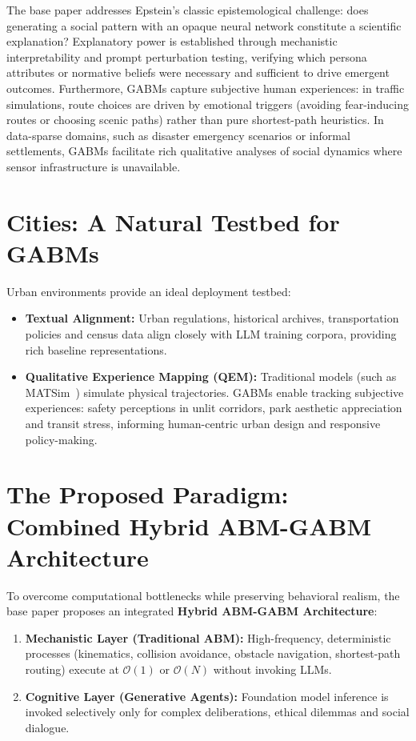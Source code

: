 \documentclass[12pt,a4paper]{report}
\begin{document}
The base paper addresses Epstein's classic epistemological challenge: does generating a social pattern with an opaque neural network constitute a scientific explanation? Explanatory power is established through mechanistic interpretability and prompt perturbation testing, verifying which persona attributes or normative beliefs were necessary and sufficient to drive emergent outcomes. Furthermore, GABMs capture subjective human experiences: in traffic simulations, route choices are driven by emotional triggers (avoiding fear-inducing routes or choosing scenic paths) rather than pure shortest-path heuristics. In data-sparse domains, such as disaster emergency scenarios or informal settlements, GABMs facilitate rich qualitative analyses of social dynamics where sensor infrastructure is unavailable.

\section{Cities: A Natural Testbed for GABMs}
\label{sec:cities_testbed}

Urban environments provide an ideal deployment testbed:
\begin{itemize}
    \item \textbf{Textual Alignment:} Urban regulations, historical archives, transportation policies and census data align closely with LLM training corpora, providing rich baseline representations.
    \item \textbf{Qualitative Experience Mapping (QEM):} Traditional models (such as MATSim~\cite{matsim2016}) simulate physical trajectories. GABMs enable tracking subjective experiences: safety perceptions in unlit corridors, park aesthetic appreciation and transit stress, informing human-centric urban design and responsive policy-making.
\end{itemize}

\section{The Proposed Paradigm: Combined Hybrid ABM-GABM Architecture}
\label{sec:hybrid_architecture}

To overcome computational bottlenecks while preserving behavioral realism, the base paper proposes an integrated \textbf{Hybrid ABM-GABM Architecture}:
\begin{enumerate}[label=\arabic*.]
    \item \textbf{Mechanistic Layer (Traditional ABM):} High-frequency, deterministic processes (kinematics, collision avoidance, obstacle navigation, shortest-path routing) execute at $\mathcal{O}(1)$ or $\mathcal{O}(N)$ without invoking LLMs.
    \item \textbf{Cognitive Layer (Generative Agents):} Foundation model inference is invoked selectively only for complex deliberations, ethical dilemmas and social dialogue.
\end{enumerate}
\end{document}
